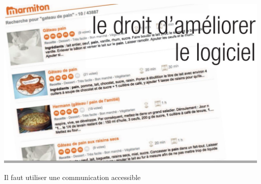 \documentclass{beamer}
\begin{document}
\begin{frame}
\includegraphics[scale=0.48] {./images/Cuisine04.jpg} 
\end{frame}

\begin{frame}
\begin{center}
\Huge{Il faut utiliser une communication accessible}
\end{center}
\end{frame}
\end{document}
